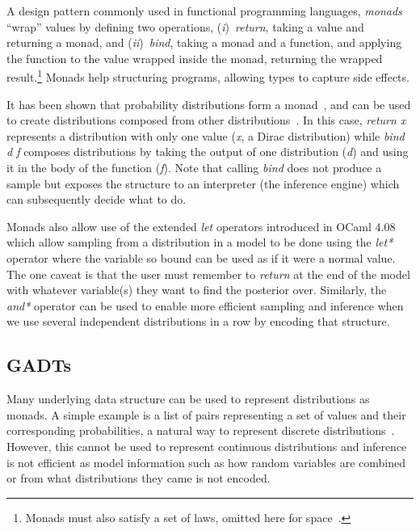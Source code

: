 \documentclass[sigconf,timestamp]{acmart}
\newcommand{\one}{({\em i})\/}
\newcommand{\two}{({\em ii})\/}
\begin{document}
A design pattern commonly used in functional programming languages, \emph{monads} ``wrap'' values by defining two operations, \one~\emph{return}, taking a value and returning a monad, and \two~\emph{bind}, taking a monad and a function, and applying the function to the value wrapped inside the monad, returning the wrapped result.\footnote{Monads must also satisfy a set of laws, omitted here for space~\cite{wadler1990comprehending}.} Monads help structuring programs, allowing types to capture side effects.

It has been shown that probability distributions form a monad~\cite{giry1982categorical, jones1989probabilistic}, and can be used to create distributions composed from other distributions~\cite{ramsey2002stochastic}. In this case, \emph{return x} represents a distribution with only one value (\emph{x}, a Dirac distribution) while \emph{bind d f} composes distributions by taking the output of one distribution (\emph{d}) and using it in the body of the function (\emph{f}). Note that calling \emph{bind} does not produce a sample but exposes the structure to an interpreter (the inference engine) which can subsequently decide what to do.

Monads also allow use of the extended \emph{let} operators introduced in OCaml 4.08 which allow sampling from a distribution in a model to be done using the \emph{let*} operator where the variable so bound can be used as if it were a normal value. The one caveat is that the user must remember to \emph{return} at the end of the model with whatever variable(s) they want to find the posterior over. Similarly, the \emph{and*} operator can be used to enable more efficient sampling and inference when we use several independent distributions in a row by encoding that structure.

\subsection{GADTs}

Many underlying data structure can be used to represent distributions as monads. A simple example is a list of pairs representing a set of values and their corresponding probabilities, a natural way to represent discrete distributions~\cite{erwig}. However, this cannot be used to represent continuous distributions and inference is not efficient as model information such as how random variables are combined or from what distributions they came is not encoded.
\end{document}
